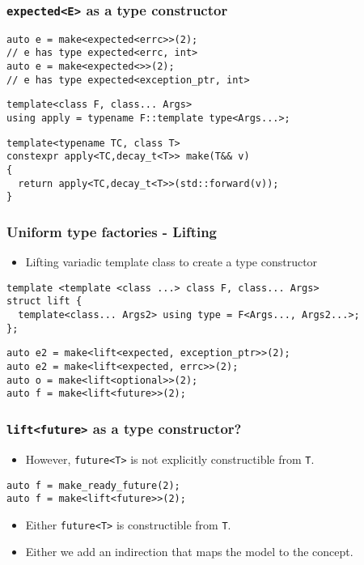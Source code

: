 \documentclass[xcolor=dvipsnames]{beamer}
\newcommand{\cpp}[1]{\lstinline{#1}}
\begin{document}
\begin{frame}[fragile]
\frametitle{\cpp{expected<E>} as a type constructor}

\begin{lstlisting}
auto e = make<expected<errc>>(2); 
// e has type expected<errc, int>
auto e = make<expected<>>(2); 
// e has type expected<exception_ptr, int>
\end{lstlisting}

\begin{lstlisting}
template<class F, class... Args>
using apply = typename F::template type<Args...>;
\end{lstlisting}
  
\begin{lstlisting}
template<typename TC, class T>
constexpr apply<TC,decay_t<T>> make(T&& v)  
{
  return apply<TC,decay_t<T>>(std::forward(v));
}
\end{lstlisting}

\end{frame}
\begin{frame}[fragile]
\frametitle{Uniform type factories - Lifting }

\begin{itemize}
  \item Lifting variadic template class to create a type constructor 
\end{itemize}

\begin{lstlisting}
template <template <class ...> class F, class... Args>
struct lift {
  template<class... Args2> using type = F<Args..., Args2...>;
};
\end{lstlisting} 

\begin{lstlisting}
auto e2 = make<lift<expected, exception_ptr>>(2); 
auto e2 = make<lift<expected, errc>>(2);
auto o = make<lift<optional>>(2); 
auto f = make<lift<future>>(2); 
\end{lstlisting}

\end{frame}
\begin{frame}[fragile]
\frametitle{\cpp{lift<future>} as a type constructor?}

\begin{itemize}
  \item However, \cpp{future<T>} is not explicitly constructible from \cpp{T}.
\end{itemize}

\begin{lstlisting}
auto f = make_ready_future(2); 
auto f = make<lift<future>>(2); 
\end{lstlisting}

\begin{itemize}
  \item Either \cpp{future<T>} is constructible from \cpp{T}.
  \item Either we add an indirection that maps the model to the concept.
\end{itemize}

\end{frame}
\end{document}
